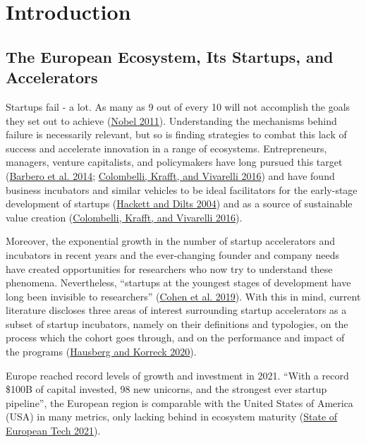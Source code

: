 \documentclass[
  12pt,
]{article}
\begin{document}
\hypertarget{introduction}{%
\section{Introduction}\label{introduction}}

\hypertarget{the-european-ecosystem-its-startups-and-accelerators}{%
\subsection{The European Ecosystem, Its Startups, and Accelerators}\label{the-european-ecosystem-its-startups-and-accelerators}}

Startups fail - a lot. As many as 9 out of every 10 will not accomplish the goals they set out to achieve (\protect\hyperlink{ref-nobel_companies_2011}{Nobel 2011}). Understanding the mechanisms behind failure is necessarily relevant, but so is finding strategies to combat this lack of success and accelerate innovation in a range of ecosystems. Entrepreneurs, managers, venture capitalists, and policymakers have long pursued this target (\protect\hyperlink{ref-barbero_different_2014}{Barbero et al. 2014}; \protect\hyperlink{ref-colombelli_be_2016}{Colombelli, Krafft, and Vivarelli 2016}) and have found business incubators and similar vehicles to be ideal facilitators for the early-stage development of startups (\protect\hyperlink{ref-hackett_systematic_2004}{Hackett and Dilts 2004}) and as a source of sustainable value creation (\protect\hyperlink{ref-colombelli_be_2016}{Colombelli, Krafft, and Vivarelli 2016}).

Moreover, the exponential growth in the number of startup accelerators and incubators in recent years and the ever-changing founder and company needs have created opportunities for researchers who now try to understand these phenomena. Nevertheless, ``startups at the youngest stages of development have long been invisible to researchers'' (\protect\hyperlink{ref-cohen_design_2019}{Cohen et al. 2019}). With this in mind, current literature discloses three areas of interest surrounding startup accelerators as a subset of startup incubators, namely on their definitions and typologies, on the process which the cohort goes through, and on the performance and impact of the programs (\protect\hyperlink{ref-hausberg_business_2020}{Hausberg and Korreck 2020}).

Europe reached record levels of growth and investment in 2021. ``With a record \$100B of capital invested, 98 new unicorns, and the strongest ever startup pipeline'', the European region is comparable with the United States of America (USA) in many metrics, only lacking behind in ecosystem maturity (\protect\hyperlink{ref-european_tech_2021}{State of European Tech 2021}).
\end{document}
